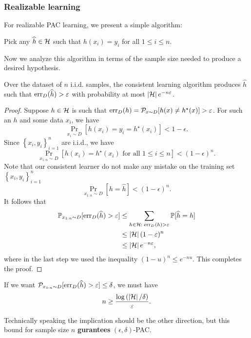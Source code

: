 \documentclass[a4paper]{article}
\begin{document}
\subsubsection{Realizable learning}

For realizable PAC learning, we present a simple algorithm:
\begin{algorithm}
Pick any $\widehat{h} \in \mathcal{H}$ such that $h(x_i) = y_i$ 
for all $1 \leq i \leq n$.
\end{algorithm}
Now we analyze this algorithm in terms of the sample size needed 
to produce a desired hypothesis.

\begin{thm}
  Over the dataset of $n$ i.i.d. samples,
  the consistent learning algorithm produces $\hat{h}$ such 
  that $\operatorname{err}_D(\widehat{h}) > \varepsilon$ with probability
  at most $\left\lvert \mathcal{H}\right\rvert e^{-n\varepsilon}$. 
\end{thm}
\begin{proof}
  Suppose $h \in \mathcal{H}$ is such that 
  $\operatorname{err}_D(h) = \mathcal{P}_{x \sim D} [h(x) \neq h^\star(x)] > \varepsilon$.
  For such an $h$ and some data $x_i$, we have 
  \[
  \Pr_{x_i \sim D} [h(x_i) = y_i = h^\star(x_i)] < 1 - \epsilon.
  \]
  Since $\left\{ x_i, y_i \right\}_{i=1}^n$ are i.i.d., we have 
  \[
  \Pr_{x_{1:n} \sim D}[h(x_i) = h^\star(x_i) \text{ for all 
  $1 \leq i \leq n$}] < (1 - \epsilon)^n.
  \]
  Note that our consistent learner do not make any mistake 
  on the training set $\left\{ x_i, y_i \right\}_{i=1}^n$
  \[
  \Pr_{x_{1 : n} \sim D} [h = \hat{h}] < (1 - \epsilon)^n.
  \]
  It follows that 
  \[
  \begin{aligned}
    \mathbb{P}_{x_{1 : n} \sim D} [\operatorname{err}_D (\widehat{h}) > \varepsilon] 
    & \leq \sum_{h \in \mathcal{H}: \; \operatorname{err}_D(h) > \varepsilon} 
    \mathbb{P}[\widehat{h} = h]  \\
    & \leq \left\lvert \mathcal{H}\right\rvert (1 - \varepsilon)^n \\
    & \leq \left\lvert \mathcal{H}\right\rvert e^{-n\varepsilon},
  \end{aligned}
  \]
  where in the last step we used the inequality 
  $(1 - u)^n \leq e^{-nu}$. This completes the proof.
\end{proof}

\begin{cor}
  If we want $\mathcal{P}_{x_{1 : n} \sim D} [\operatorname{err}_D (\widehat{h}) > \varepsilon]
  \leq \delta$, we must have 
  \[
  n \geq \frac{\log \left( \left\lvert \mathcal{H}\right\rvert / \delta \right)}{\varepsilon}.
  \]
\end{cor}
Technically speaking the implication should be the other direction, 
but this bound for sample size $n$ 
\textbf{gurantees} $(\epsilon, \delta)$-PAC.
\end{document}
